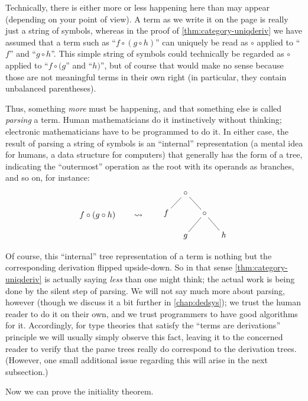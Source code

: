 \documentclass{book}
\begin{document}
\begin{rmk}
  Technically, there is either more or less happening here than may appear (depending on your point of view).
  A term as we write it on the page is really just a string of symbols, whereas in the proof of \cref{thm:category-uniqderiv} we have assumed that a term such as ``$f\circ (g\circ h)$'' can uniquely be read as $\circ$ applied to ``$f$'' and ``$g\circ h$''.
  This simple string of symbols could technically be regarded as $\circ$ applied to ``$f\circ (g$'' and ``$h)$'', but of course that would make no sense because those are not meaningful terms in their own right (in particular, they contain unbalanced parentheses).

  Thus, something \emph{more} must be happening, and that something else is called \emph{parsing} a term.
  Human mathematicians do it instinctively without thinking; electronic mathematicians have to be programmed to do it.
  In either case, the result of parsing a string of symbols is an ``internal'' representation (a mental idea for humans, a data structure for computers) that generally has the form of a tree, indicating the ``outermost'' operation as the root with its operands as branches, and so on, for instance:
  \[ f\circ (g\circ h) \qquad\leadsto\qquad \vcenter{\xymatrix@-1pc{ & \circ \ar@{-}[dl] \ar@{-}[dr]\\
      f && \circ \ar@{-}[dl]\ar@{-}[dr]\\
      & g && h }} \]

  Of course, this ``internal'' tree representation of a term is nothing but the corresponding derivation flipped upside-down.
  So in that sense \cref{thm:category-uniqderiv} is actually saying \emph{less} than one might think; the actual work is being done by the silent step of parsing.
  We will not say much more about parsing, however (though we discuss it a bit further in \cref{chap:dedsys}); we trust the human reader to do it on their own, and we trust programmers to have good algorithms for it.
  Accordingly, for type theories that satisfy the ``terms are derivations'' principle we will usually simply observe this fact, leaving it to the concerned reader to verify that the parse trees really do correspond to the derivation trees.
  (However, one small additional issue regarding this will arise in the next subsection.)
\end{rmk}

Now we can prove the initiality theorem.
\end{document}
